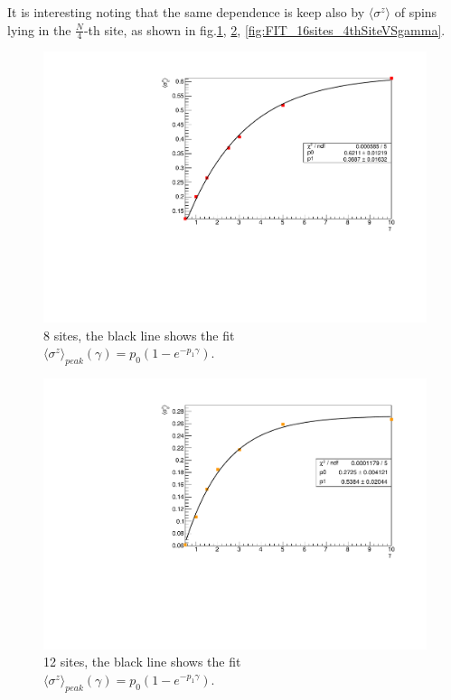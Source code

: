 It is interesting noting that the same dependence is keep also by $\langle\sigma^z\rangle$ of spins lying in the $\frac{N}{4}$-th site, as shown in fig.\ref{fig:FIT8sites_LM_2ndSiteVSgamma}, \ref{fig:FIT12sites_3rdSiteVSgamma}, \ref{fig:FIT_16sites_4thSiteVSgamma}.

\begin{figure}[H]
    \centering
    \includegraphics[scale=0.7]{Figures/8sites/FIT_8sites_2ndLMvsGamma.pdf}
    \caption{8 sites, the black line shows the fit \\$\langle\sigma^z\rangle_{peak}(\gamma) = p_0(1-e^{-p_1\gamma})$.}
    \label{fig:FIT8sites_LM_2ndSiteVSgamma}
\end{figure}

\begin{figure}[H]
    \centering
    \includegraphics[scale=0.7]{Figures/12sites/FIT_12sites_3rdLMvsGamma.pdf}
    \caption{12 sites, the black line shows the fit \\$\langle\sigma^z\rangle_{peak}(\gamma) = p_0(1-e^{-p_1\gamma})$.}
    \label{fig:FIT12sites_3rdSiteVSgamma}
\end{figure}

